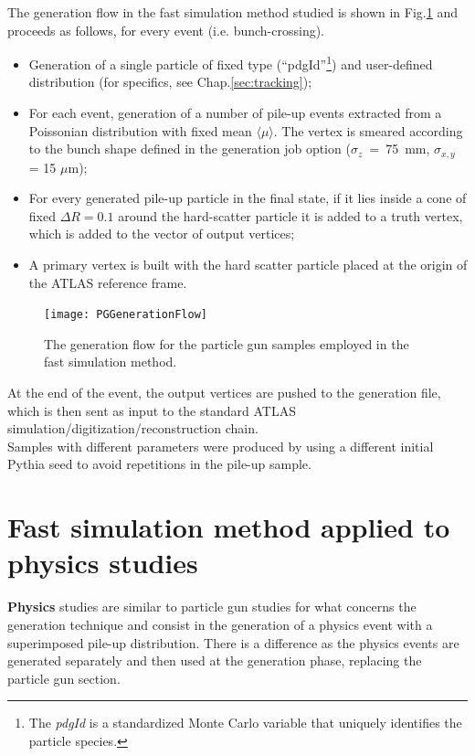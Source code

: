 \documentclass[a4paper,twoside,12pt]{book}
\begin{document}
The generation flow in the fast simulation method studied is shown in Fig.\ref{fig:PGGenerationFlow} and proceeds as follows,
for every event (i.e. bunch-crossing).\\
\begin{itemize}
\item Generation of a single particle of fixed type (``pdgId''\footnote{The \textit{pdgId} 
is a standardized Monte Carlo variable that uniquely identifies the particle species.}) and 
user-defined distribution (for specifics, see Chap.\ref{sec:tracking});
\item For each event, generation of a number of pile-up events extracted from a Poissonian
distribution with fixed mean $\langle\mu\rangle$. The vertex is smeared according to the bunch shape
defined in the generation job option (\mbox{$\sigma_{z}$ = 75 mm}, $\sigma_{x,y}$ = 15 $\mu$m);
\item For every generated pile-up particle in the final state, if it lies inside a cone of fixed
$\Delta R = 0.1$ around the hard-scatter particle it is added to a truth vertex, which is added to the vector of output vertices;
\item A primary vertex is built with the hard scatter particle placed at the origin of the
ATLAS reference frame.
\end{itemize}

\begin{figure} [h]
	\texttt{[image: PGGenerationFlow]}
	\caption{The generation flow for the particle gun samples employed in the fast 
	simulation method. }
	\label{fig:PGGenerationFlow}
\end{figure}

At the end of the event, the output vertices are pushed to the generation file, which is then
sent as input to the standard ATLAS simulation/digitization/reconstruction chain.\\

Samples with different parameters were produced by using a different initial Pythia seed to 
avoid repetitions in the pile-up sample. \\

\section{Fast simulation method applied to\\
physics studies}\label{sec:simulation:physicsSimulation}

\textbf{Physics} studies are similar to particle gun studies for what concerns the generation technique and 
consist in the generation of a physics event with a superimposed pile-up distribution. There is a difference as
the physics events are generated separately and then used at the generation phase, replacing the particle gun
section.\\
\end{document}
